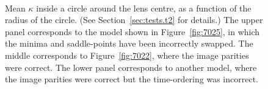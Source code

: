 \documentclass[usenatbib]{mn2e}
\newcommand{\figref}[1]{Figure~\ref{fig:#1}}
\newcommand{\secref}[1]{Section~\ref{sec:#1}}
\begin{document}
\begin{figure}
  \centering
   \\
  \caption{Mean $\kappa$ inside a circle around the lens centre, as a
    function of the radius of the circle.  (See \secref{tests.t2} for
    details.) The upper panel corresponds to the model shown in
    \figref{7025}, in which the minima and saddle-points have been
    incorrectly swapped.  The middle corresponds to \figref{7022},
    where the image parities were correct.  The lower panel
    corresponds to another model, where the image parities were
    correct but the time-ordering was incorrect.}
\label{fig:kapenc_compare_faulty}
\end{figure}
\end{document}
